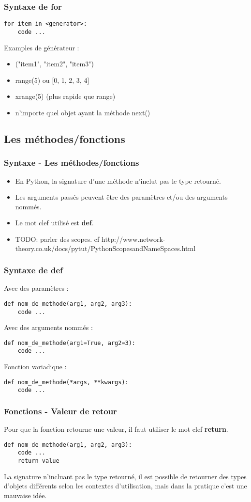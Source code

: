 \begin{frame}[fragile]
  \frametitle{Syntaxe de for}
  \begin{lstlisting}
for item in <generator>:
    code ...
  \end{lstlisting}
Examples de générateur :
  \begin{itemize}
  \item ("item1", "item2", "item3")
  \item range(5) ou [0, 1, 2, 3, 4]
  \item xrange(5) (plus rapide que range)
  \item n'importe quel objet ayant la méthode next()
  \end{itemize}
\end{frame}

\subsection{Les méthodes/fonctions}
\begin{frame}[fragile]
  \frametitle{Syntaxe - Les méthodes/fonctions}
  \begin{itemize}
    \item En Python, la signature d'une méthode n'inclut pas le type retourné.
    \item Les arguments passés peuvent être des paramètres et/ou des arguments nommés.
    \item Le mot clef utilisé est {\bf def}.
    \item TODO: parler des scopes. cf http://www.network-theory.co.uk/docs/pytut/PythonScopesandNameSpaces.html
  \end{itemize}
\end{frame}

\begin{frame}[fragile]
  \frametitle{Syntaxe de def}
Avec des paramètres :
  \begin{lstlisting}
def nom_de_methode(arg1, arg2, arg3):
    code ...
  \end{lstlisting}
Avec des arguments nommés :
  \begin{lstlisting}
def nom_de_methode(arg1=True, arg2=3):
    code ...
  \end{lstlisting}
Fonction variadique :
  \begin{lstlisting}
def nom_de_methode(*args, **kwargs):
    code ...
  \end{lstlisting}
\end{frame}

\begin{frame}[fragile]
  \frametitle{Fonctions - Valeur de retour}
Pour que la fonction retourne une valeur, il faut utiliser le mot clef {\bf return}.
  \begin{lstlisting}
def nom_de_methode(arg1, arg2, arg3):
    code ...
    return value
  \end{lstlisting}

La signature n'incluant pas le type retourné, il est possible de retourner des types d'objets différents selon les contextes d'utilisation, mais dans la pratique c'est une mauvaise idée.
\end{frame}

